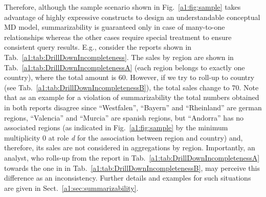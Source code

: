 Therefore, although the sample scenario shown in
Fig.~\ref{a1:fig:sample} takes advantage of highly expressive
constructs to design an understandable conceptual MD model,
summarizability is guaranteed only in case of many-to-one
relationships whereas the other cases require special treatment to
ensure consistent query results.  E.g., consider the reports shown
in Tab.~\ref{a1:tab:DrillDownIncompleteness}. The sales by region
are shown in Tab.~\ref{a1:tab:DrillDownIncompletenessA} (each region
belongs to exactly one country), where the total amount is $60$.
However, if we try to roll-up to country (see
Tab.~\ref{a1:tab:DrillDownIncompletenessB}), the total sales change
to $70$.  Note that as an example for a violation of summarizability
the total numbers obtained in both reports disagree since
``Westfalen'', ``Bayern'' and ``Rheinland'' are german regions,
``Valencia'' and ``Murcia'' are spanish regions, but ``Andorra'' has
no associated regions (as indicated in Fig.~\ref{a1:fig:sample} by
the minimum multiplicity $0$ at role \emph{d} for the association
between region and country) and, therefore, its sales are not
considered in aggregations by region. Importantly, an analyst, who
rolls-up from the report in
Tab.~\ref{a1:tab:DrillDownIncompletenessA} towards the one in in
Tab.~\ref{a1:tab:DrillDownIncompletenessB}, may perceive this
difference as an inconsistency. Further details and examples for
such situations are given in Sect.~\ref{a1:sec:summarizability}.

\begin{table}
\centering \caption{Inconsistent totals for sales due to drill-down
incompleteness}
     \label{a1:tab:DrillDownIncompleteness}
 \qquad \qquad {}
\end{table}

